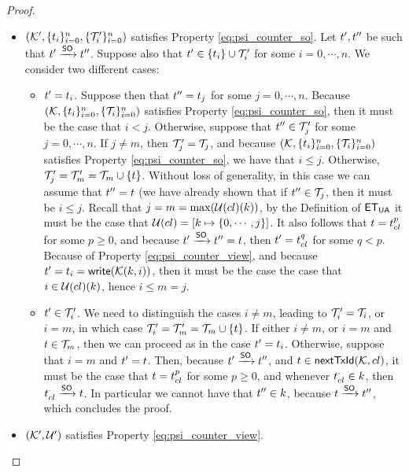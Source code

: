 \begin{proof}
\begin{itemize}
\begin{itemize}
\item $(\mathcal{K}',  \{t_{i}\}_{i=0}^{n}, \{\mathcal{T}'_{i}\}_{i=0}^{n})$ satisfies Property \eqref{eq:psi_counter_so}. 
Let $t', t''$ be such that $t' \xrightarrow{\mathsf{SO}} t''$. 
Suppose also that $t' \in \{t_{i}\} \cup \mathcal{T}'_{i}$ for some $i = 0,\cdots, n$. We consider two different cases:
\begin{itemize}
\item $t' = t_{i}$. Suppose then that $t'' = t_{j}$ for some $j = 0, \cdots, n$. Because 
$(\mathcal{K},  \{t_{i}\}_{i=0}^{n}, \{\mathcal{T}_{i}\}_{i=0}^{n})$ satisfies Property 
\eqref{eq:psi_counter_so}, then it must be the case that $i < j$. Otherwise, 
suppose that $t'' \in \mathcal{T}'_{j}$ for some $j=0,\cdots,n$. If $j \neq m$, then $\mathcal{T}'_{j} = \mathcal{T}_{j}$, 
and because $(\mathcal{K},  \{t_{i}\}_{i=0}^{n}, \{\mathcal{T}_{i}\}_{i=0}^{n})$ satisfies Property \eqref{eq:psi_counter_so}, we have that $i \leq j$. 
Otherwise, $\mathcal{T}'_{j} = \mathcal{T}'_{m} =  \mathcal{T}_{m} \cup \{t\}$. Without loss of generality, in this case 
we can assume that $t'' = t$ (we have already shown that if $t'' \in \mathcal{T}_{j}$, then 
it must be $i \leq j$. Recall that $j = m = \max(\mathcal{U}({cl})(k))$, by the Definition of 
$\mathsf{ET}_{\mathsf{UA}}$ it must be the case that $\mathcal{U}({cl}) = [k \mapsto \{0,\cdots, j\}]$. 
It also follows that $t = t_{{cl}}^{p}$ for some $p \geq 0$, and because $t' \xrightarrow{\mathsf{SO}} t'' = t$, 
then $t' = t_{{cl}}^{q}$ for some $q < p$. Because of Property 
\eqref{eq:psi_counter_view}, and because $t' = t_{i} = \mathsf{write}(\mathcal{K}(k, i))$, then it must be the case the 
case that $i \in \mathcal{U}({cl})(k)$, hence  $i \leq m = j$.

\item $t' \in \mathcal{T}'_{i}$. We need to distinguish the cases $i \neq m$, leading to $\mathcal{T}'_{i} = \mathcal{T}_{i}$, 
or $i = m$, in which case $\mathcal{T}'_{i} = \mathcal{T}'_{m} = \mathcal{T}_{m} \cup \{t\}$. If either $i \neq m$, or $i = m$ and $t \in 
\mathcal{T}_{m}$, then we can proceed as in the case $t' = t_{i}$. Otherwise, suppose that $i = m$ and 
$t' = t$. Then, because $t' \xrightarrow{\mathsf{SO}} t''$, and $t \in \mathsf{nextTxId}(\mathcal{K},{cl})$, 
it must be the case that $t = t_{{cl}}^{p}$ for some $p \geq 0$, and whenever 
$t_{{cl}}^{\cdot} \in k$, then $t_{{cl}}^{\cdot} \xrightarrow{\mathsf{SO}} t$. In particular 
we cannot have that $t'' \in k$, because $t \xrightarrow{\mathsf{SO}} t''$, which 
concludes the proof.
\end{itemize}

\item $(\mathcal{K}', \mathcal{U}')$ satisfies Property \eqref{eq:psi_counter_view}.

\end{itemize}

\end{itemize}

\end{proof}

